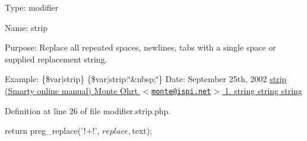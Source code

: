 \-Type\-: modifier\par
 \-Name\-: strip\par
 \-Purpose\-: \-Replace all repeated spaces, newlines, tabs with a single space or supplied replacement string.\par
 \-Example\-: \{\$var$|$strip\} \{\$var$|$strip\-:\char`\"{}\&nbsp;\char`\"{}\} \-Date\-: \-September 25th, 2002 \hyperlink{}{strip (\-Smarty online manual)  \-Monte \-Ohrt $<$\href{mailto:monte@ispi.net}{\tt monte@ispi.\-net}$>$  1.  string  string  string }

\-Definition at line 26 of file modifier.\-strip.\-php.


\begin{DoxyCode}
{
        return preg_replace('!\s+!', $replace, $text);
}
\end{DoxyCode}
